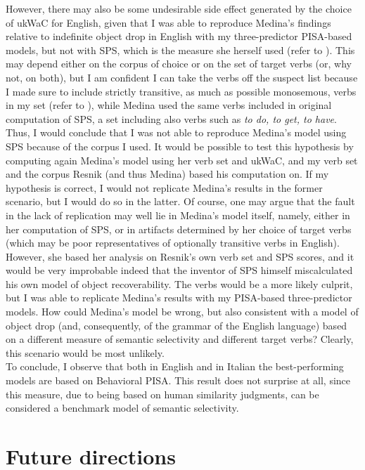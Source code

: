 However, there may also be some undesirable side effect generated by the choice of ukWaC for English, given that I was able to reproduce Medina's findings relative to indefinite object drop in English with my three-predictor PISA-based models, but not with SPS, which is the measure she herself used (refer to ). This may depend either on the corpus of choice or on the set of target verbs (or, why not, on both), but I am confident I can take the verbs off the suspect list because I made sure to include strictly transitive, as much as possible monosemous, verbs in my set (refer to ), while Medina used the same verbs included in  original computation of SPS, a set including also verbs such as \textit{to do, to get, to have}. Thus, I would conclude that I was not able to reproduce Medina's model using SPS because of the corpus I used. It would be possible to test this hypothesis by computing again Medina's model using her verb set and ukWaC, and my verb set and the corpus Resnik (and thus Medina) based his computation on. If my hypothesis is correct, I would not replicate Medina's results in the former scenario, but I would do so in the latter. Of course, one may argue that the fault in the lack of replication may well lie in Medina's model itself, namely, either in her computation of SPS, or in artifacts determined by her choice of target verbs (which may be poor representatives of optionally transitive verbs in English). However, she based her analysis on Resnik's own verb set and SPS scores, and it would be very improbable indeed that the inventor of SPS himself miscalculated his own model of object recoverability. The verbs would be a more likely culprit, but I was able to replicate Medina's results with my PISA-based three-predictor models. How could Medina's model be wrong, but also consistent with a model of object drop (and, consequently, of the grammar of the English language) based on a different measure of semantic selectivity and different target verbs? Clearly, this scenario would be most unlikely.\\
To conclude, I observe that both in English and in Italian the best-performing models are based on Behavioral PISA. This result does not surprise at all, since this measure, due to being based on human similarity judgments, can be considered a benchmark model of semantic selectivity.


\section{Future directions} 


